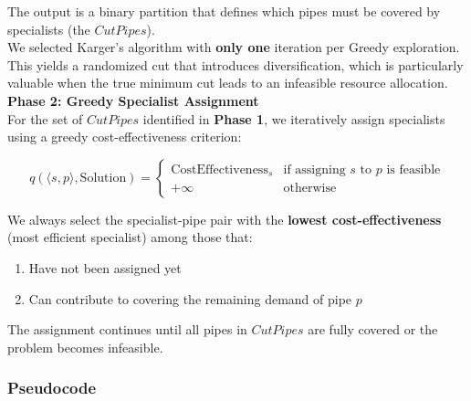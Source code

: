 \documentclass{article}
\begin{document}
The output is a binary partition that defines which pipes must be covered by specialists (the $CutPipes$).
\\[0.2cm]

We selected Karger's algorithm with \textbf{only one} iteration per Greedy exploration. This yields a randomized cut that introduces diversification, which is particularly valuable when the true minimum cut leads to an infeasible resource allocation.
\\[0.2cm]

\textbf{Phase 2: Greedy Specialist Assignment}
\\[0.2cm]
For the set of $CutPipes$ identified in \textbf{Phase 1}, we iteratively assign specialists using a greedy cost-effectiveness criterion:

\begin{displaymath}
    q(\langle s, p \rangle, \text{Solution}) = \begin{cases}
    \text{CostEffectiveness}_s & \text{if assigning } s \text{ to } p \text{ is feasible}\\
    +\infty & \text{otherwise}
    \end{cases}
\end{displaymath}

We always select the specialist-pipe pair with the \textbf{lowest cost-effectiveness} (most efficient specialist) among those that:
\begin{enumerate}
    \item Have not been assigned yet
    \item Can contribute to covering the remaining demand of pipe $p$
\end{enumerate}

The assignment continues until all pipes in $CutPipes$ are fully covered or the problem becomes infeasible.

\subsubsection{Pseudocode}
\end{document}
